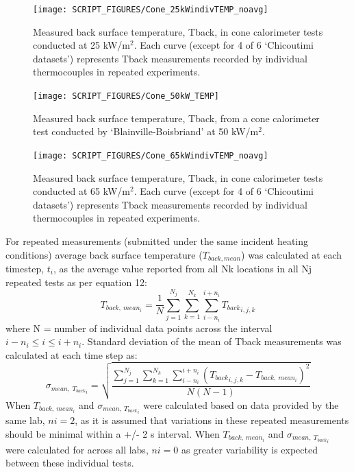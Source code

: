 \documentclass{book}
\begin{document}
\begin{figure}
  \centering
  \texttt{[image: SCRIPT\_FIGURES/Cone\_25kWindivTEMP\_noavg]}
  \caption{Measured back surface temperature, Tback, in cone calorimeter tests conducted at 25 kW/m$^2$. Each curve (except for 4 of 6 ‘Chicoutimi datasets’) represents Tback measurements recorded by individual thermocouples in repeated experiments.}
  \label{Fig:Cone_25kWindivTEMP}
\end{figure}

\begin{figure}
  \centering
  \texttt{[image: SCRIPT\_FIGURES/Cone\_50kW\_TEMP]}
  \caption{Measured back surface temperature, Tback, from a cone calorimeter test conducted by ‘Blainville-Boisbriand’ at 50 kW/m$^2$.}
  \label{Fig:Cone_50kWindivTEMP}
\end{figure}

\begin{figure}
  \centering
  \texttt{[image: SCRIPT\_FIGURES/Cone\_65kWindivTEMP\_noavg]}
  \caption{Measured back surface temperature, Tback, in cone calorimeter tests conducted at 65 kW/m$^2$. Each curve (except for 4 of 6 ‘Chicoutimi datasets’) represents Tback measurements recorded by individual thermocouples in repeated experiments.}
  \label{Fig:Cone_65kWindivTEMP}
\end{figure}


For repeated measurements (submitted under the same incident heating conditions) average back surface temperature ($T_{back,mean}$) was calculated at each timestep, $t_i$, as the average value reported from all Nk locations in all Nj repeated tests as per equation 12:
\begin{equation}
   T_{back,\ mean_i}=\frac{1}{N}\sum_{j=1}^{N_j}\sum_{k=1}^{N_k}\sum_{i-n_i}^{i+n_i}{T_{back}}_{i,j,k}
\end{equation}
where N = number of individual data points across the interval $i-n_i\le i\le i+n_i$. Standard deviation of the mean of Tback measurements was calculated at each time step as:
\begin{equation}
   \sigma_{mean,\ {T_{back}}_i}=\sqrt{\frac{\sum_{j=1}^{N_j}\sum_{k=1}^{N_k}\sum_{i-n_i}^{i+n_i}\left({T_{back}}_{i,j,k}-T_{back,\ mean_i}\right)^2}{N\left(N-1\right)}}
\end{equation}
When $T_{back,\ mean_i}$ and $\sigma_{mean,\ {T_{back}}_i}$ were calculated based on data provided by the same lab, $ni =2$, as it is assumed that variations in these repeated measurements should be minimal within a +/- 2 s interval. When $T_{back,\ mean_i}$ and $\sigma_{mean,\ {T_{back}}_i}$ were calculated for across all labs, $ni=0$ as greater variability is expected between these individual tests.
\end{document}
